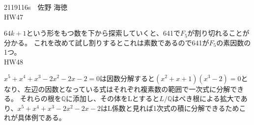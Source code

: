 \documentclass[11pt]{jsarticle}
\begin{document}
2119116s　佐野 海徳\\
HW47
\par$64k + 1$という形をもつ数を下から探索していくと、641で$F_5$が割り切れることが分かる。
これを改めて試し割りするとこれは素数であるので641が$F_5$の素因数の1つ。\\
HW48
\par $x^5 + x^4 + x^3 - 2x^2 - 2x - 2 = 0$は因数分解すると$(x^2 + x + 1)(x^3 - 2) = 0$となり、左辺の因数となっている式はそれぞれ複素数の範囲で一次式に分解できる。
それらの根を$\mathbb{Q}$に添加し、その体をLとすると$L/ \mathbb{Q}$はべき根による拡大であり、$x^5 + x^4 + x^3 -2x^2 - 2x - 2$はL係数と見れば1次式の積に分解できるためこれが具体例である。
\end{document}

